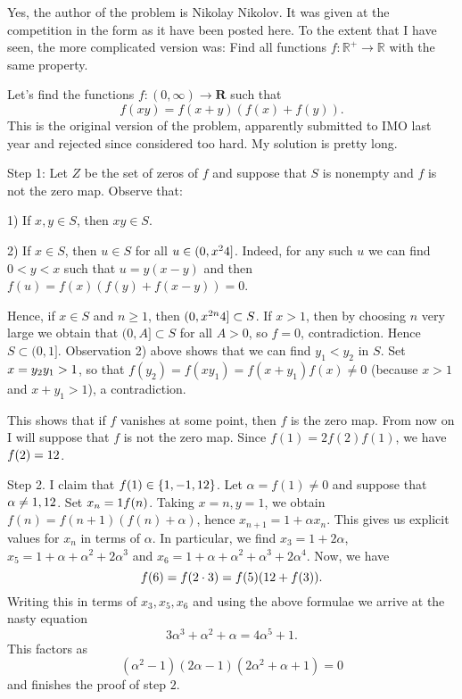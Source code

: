 \begin{solution}
	Yes, the author of the problem is Nikolay Nikolov. It was given at the competition in the form as it have been posted here. To the extent that I have seen, the more complicated version was: 
Find all functions $ f: \mathbb{R}^+ \to \mathbb{R}$ with the same property.
\end{solution}



\begin{solution}
	Let's find the functions $f:(0,\infty)\to \mathbf{R}$ such that 
  \[f(xy)=f(x+y)(f(x)+f(y)).\] This is the original version of the problem, apparently submitted to IMO last year and rejected since considered too hard. My solution is pretty long.
  
   Step 1: Let $Z$ be the set of zeros of $f$ and suppose that $S$ is nonempty and 
   $f$ is not the zero map. Observe that:
   
   1) If $x,y\in S$, then $xy\in S$. 
   
   2) If $x\in S$, then $u\in S$ for all $u\in (0, x^2\/4]$. Indeed, for any such $u$ we can find 
   $0<y<x$ such that $ u=y(x-y)$ and then $f(u)=f(x)(f(y)+f(x-y))=0$. 
   
     Hence, if $x\in S$ and $n\geq 1$, then $(0, x^{2n}\/4]\subset S$. If $x>1$, then by choosing 
     $n$ very large we obtain that $(0, A]\subset S$ for all $A>0$, so $f=0$, contradiction. Hence 
     $S\subset (0, 1]$. Observation 2) above shows that we can find $y_1<y_2$ in $S$.
     Set $x=y_2\/y_1>1$, so that $f(y_2)=f(xy_1)=f(x+y_1)f(x)\ne 0$ (because $x>1$ and $x+y_1>1$), a contradiction. 
     
     This shows that if $f$ vanishes at some point, then $f$ is the zero map. From now on I will suppose that 
     $f$ is not the zero map. Since $f(1)=2f(2) f(1)$, we have $f(2)=1\/2$.
     
    Step 2. I claim that $f(1)\in \{1, -1, 1\/2\}$. Let $\alpha=f(1)\ne 0$ and suppose that 
    $\alpha\ne 1, 1\/2$. Set $x_n=1\/f(n)$. Taking $x=n, y=1$, we obtain 
    $f(n)=f(n+1)(f(n)+\alpha)$, hence $x_{n+1}=1+\alpha x_n$.  This gives us explicit values for 
    $x_n$ in terms of $\alpha$. In particular, we find $x_3=1+2\alpha$,
    $x_5=1+\alpha+\alpha^2+2\alpha^3$ and $x_6=1+\alpha+\alpha^2+\alpha^3+2\alpha^4$.
    Now, we have \[f(6)=f(2\cdot 3)=f(5)( 1\/2+f(3)).\]
    Writing this in terms of $x_3, x_5, x_6$ and using the above formulae we arrive at the nasty equation 
    \[ 3\alpha^3+\alpha^2+\alpha= 4\alpha^5+1.\]
     This factors as \[ (\alpha^2-1)(2\alpha-1)(2\alpha^2+\alpha+1)=0\]
     and finishes the proof of step $2$. 
     

\end{solution}
